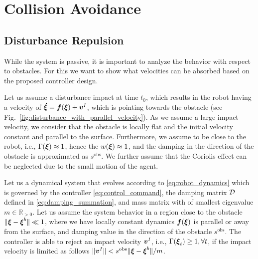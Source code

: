 \section{Collision Avoidance} \label{sec:collision_avoidance}

\subsection{Disturbance Repulsion}
While the system is passive, it is important to analyze the behavior with respect to obstacles. For this we want to show what velocities can be absorbed based on the proposed controller design.

Let us assume a disturbance impact at time $t_0$, which results in the robot having a velocity of $\boldsymbol{\dot \xi} = \boldsymbol{f}(\boldsymbol{\xi}) + \boldsymbol{v}^I$, which is pointing towards the obstacle (see Fig.~\ref{fig:disturbance_with_parallel_velocity}). As we assume a large impact velocity, we consider that the obstacle is locally flat and the initial velocity constant and parallel to the surface. Furthermore, we assume to be close to the robot, i.e., $\Gamma(\boldsymbol{\xi}) \approx 1$, hence the $w(\boldsymbol{\xi}) \approx 1$, and the damping in the direction of the obstacle is approximated as $s^{\mathrm{obs}}$.
We further assume that the Coriolis effect can be neglected due to the small motion of the agent.

\begin{lemma}
	Let us a dynamical system that evolves according to \eqref{eq:robot_dynamics} which is governed by the controller \eqref{eq:control_command}, the damping matrix $\mathcal{D}$ defined in \eqref{eq:damping_summation}, and mass matrix with of smallest eigenvalue $m \in \mathbb{R}_{>0}$.
	Let us assume the system behavior in a region close to the obstacle $\| \boldsymbol{\xi} - \boldsymbol{\xi}^b \| \ll 1$, where we have locally constant dynamics $\boldsymbol{f}(\boldsymbol{\xi})$ is parallel or away from the surface, and damping value in the direction of the obstacle $s^{\mathrm{obs}}$.
	The controller is able to reject an impact velocity $\boldsymbol{v}^I$, i.e., $\Gamma(\boldsymbol{\xi}_t) \geq 1, \forall t$, if the impact velocity is limited as follows $\| \boldsymbol{v}^I \| < s^{\mathrm{obs}} \| \boldsymbol{\xi} - \boldsymbol{\xi}^b \| / m$.
\end{lemma}

